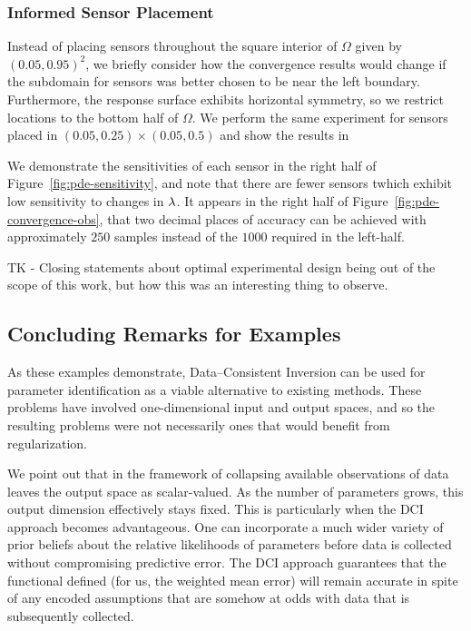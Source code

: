 \subsubsection{Informed Sensor Placement}
Instead of placing sensors throughout the square interior of $\Omega$ given by $(0.05, 0.95)^2$, we briefly consider how the convergence results would change if the subdomain for sensors was better chosen to be near the left boundary.
Furthermore, the response surface exhibits horizontal symmetry, so we restrict locations to the bottom half of $\Omega$.
We perform the same experiment for sensors placed in $(0.05, 0.25)\times(0.05, 0.5)$ and show the results in

We demonstrate the sensitivities of each sensor in the right half of Figure~\ref{fig:pde-sensitivity}, and note that there are fewer sensors twhich exhibit low sensitivity to changes in $\lambda$.
It appears in the right half of Figure~\ref{fig:pde-convergence-obs}, that two decimal places of accuracy can be achieved with approximately $250$ samples instead of the $1000$ required in the left-half.


TK - Closing statements about optimal experimental design being out of the scope of this work, but how this was an interesting thing to observe.


\subsection{Concluding Remarks for Examples}

As these examples demonstrate, Data--Consistent Inversion can be used for parameter identification as a viable alternative to existing methods.
These problems have involved one-dimensional input and output spaces, and so the resulting problems were not necessarily ones that would benefit from regularization.

We point out that in the framework of collapsing available observations of data leaves the output space as scalar-valued.
As the number of parameters grows, this output dimension effectively stays fixed.
This is particularly when the DCI approach becomes advantageous.
One can incorporate a much wider variety of prior beliefs about the relative likelihoods of parameters before data is collected without compromising predictive error.
The DCI approach guarantees that the functional defined (for us, the weighted mean error) will remain accurate in spite of any encoded assumptions that are somehow at odds with data that is subsequently collected.

